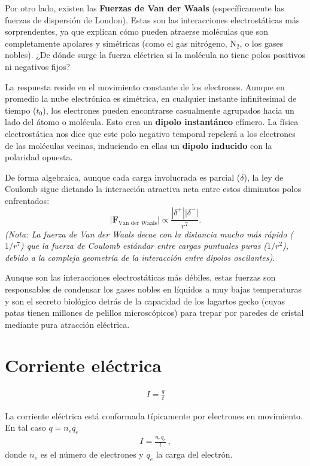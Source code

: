 \documentclass[11pt,a4paper]{book}
\begin{document}
Por otro lado, existen las \textbf{Fuerzas de Van der Waals} (específicamente las fuerzas de dispersión de London). Estas son las interacciones electrostáticas más sorprendentes, ya que explican cómo pueden atraerse moléculas que son completamente apolares y simétricas (como el gas nitrógeno, $\text{N}_2$, o los gases nobles). 
¿De dónde surge la fuerza eléctrica si la molécula no tiene polos positivos ni negativos fijos?

La respuesta reside en el movimiento constante de los electrones. Aunque en promedio la nube electrónica es simétrica, en cualquier instante infinitesimal de tiempo ($t_0$), los electrones pueden encontrarse casualmente agrupados hacia un lado del átomo o molécula. Esto crea un \textbf{dipolo instantáneo} efímero. 
La física electrostática nos dice que este polo negativo temporal repelerá a los electrones de las moléculas vecinas, induciendo en ellas un \textbf{dipolo inducido} con la polaridad opuesta.

De forma algebraica, aunque cada carga involucrada es parcial ($\delta$), la ley de Coulomb sigue dictando la interacción atractiva neta entre estos diminutos polos enfrentados:
\begin{equation}
    |\boldsymbol{F}_{\text{Van der Waals}}| \propto \frac{|\delta^+| |\delta^-|}{r^7}.
\end{equation}
\textit{(Nota: La fuerza de Van der Waals decae con la distancia mucho más rápido ($1/r^7$) que la fuerza de Coulomb estándar entre cargas puntuales puras ($1/r^2$), debido a la compleja geometría de la interacción entre dipolos oscilantes).}

Aunque son las interacciones electrostáticas más débiles, estas fuerzas son responsables de condensar los gases nobles en líquidos a muy bajas temperaturas y son el secreto biológico detrás de la capacidad de los lagartos gecko (cuyas patas tienen millones de pelillos microscópicos) para trepar por paredes de cristal mediante pura atracción eléctrica.



\section{Corriente eléctrica}
\begin{align}
    I =\frac{q}{t}
\end{align}

La corriente eléctrica está conformada típicamente por electrones en movimiento. En tal caso $q=n_e q_e$
\begin{align}
    I = \frac{n_e q_e}{t}\,,
\end{align}
donde $n_e$ es el número de electrones y $q_e$ la carga del electrón.
\end{document}
